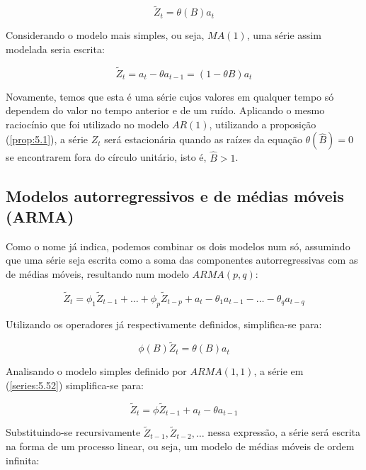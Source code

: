 \begin{equation}\label{series:5.45}
\tilde{Z}_t = \theta(B) a_t 
\end{equation}

Considerando o modelo mais simples, ou seja, $MA(1)$, uma série assim modelada seria escrita:

\[
\tilde{Z}_t = a_t - \theta a_{t-1} = (1 - \theta B)a_t
\]

Novamente, temos que esta é uma série cujos valores em qualquer tempo só dependem do valor no tempo anterior e de um ruído. Aplicando o mesmo raciocínio que foi utilizado no modelo $AR(1)$, utilizando a proposição (\ref{prop:5.1}), a série $Z_t$ será estacionária quando as raízes da equação $\theta(\hat{B}) = 0$ se encontrarem fora do círculo unitário, isto é, $\hat{B} > 1$.


\subsection{Modelos autorregressivos e de médias móveis (ARMA)}

Como o nome já indica, podemos combinar os dois modelos num só, assumindo que uma série seja escrita como a soma das componentes autorregressivas com as de médias móveis, resultando num modelo $ARMA(p, q)$:

\begin{equation}\label{series:5.52}
\tilde{Z}_t = \phi_1 \tilde{Z}_{t-1} + \ldots + \phi_p \tilde{Z}_{t-p} + a_t - \theta_1 a_{t-1} - \ldots - \theta_q a_{t-q}
\end{equation}

Utilizando os operadores já respectivamente definidos, simplifica-se para:

\begin{equation}\label{series:5.53}
\phi(B)\tilde{Z}_t = \theta(B)a_t
\end{equation}

Analisando o modelo simples definido por $ARMA(1, 1)$, a série em (\ref{series:5.52}) simplifica-se para:

\begin{equation}\label{series:5.54}
\tilde{Z}_t = \phi \tilde{Z}_{t-1} + a_t - \theta a_{t-1}
\end{equation}

Substituindo-se recursivamente $\tilde{Z}_{t-1}, \tilde{Z}_{t-2}, \ldots$ nessa expressão, a série será escrita na forma de um processo linear, ou seja, um modelo de médias móveis de ordem infinita:

